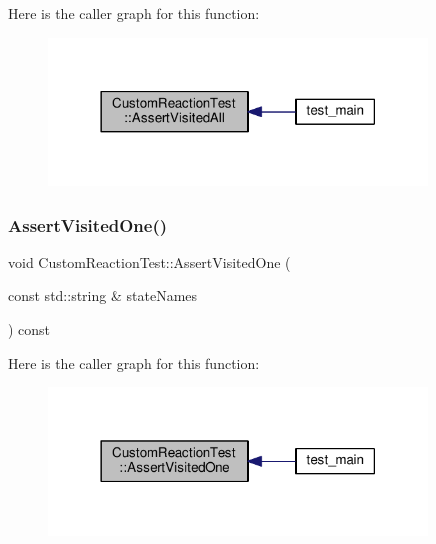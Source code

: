 Here is the caller graph for this function\+:
\nopagebreak
\begin{figure}[H]
\begin{center}
\leavevmode
\includegraphics[width=285pt]{struct_custom_reaction_test_a0f75c5c035c97fa960064afa6656ae06_icgraph}
\end{center}
\end{figure}
\mbox{\label{struct_custom_reaction_test_aab84126951398a6b976417dc01ceacb0}} 
\subsubsection{\texorpdfstring{Assert\+Visited\+One()}{AssertVisitedOne()}}
{\footnotesize\ttfamily void Custom\+Reaction\+Test\+::\+Assert\+Visited\+One (\begin{DoxyParamCaption}\item[{const std\+::string \&}]{state\+Names }\end{DoxyParamCaption}) const\hspace{0.3cm}{\ttfamily [inline]}}

Here is the caller graph for this function\+:
\nopagebreak
\begin{figure}[H]
\begin{center}
\leavevmode
\includegraphics[width=285pt]{struct_custom_reaction_test_aab84126951398a6b976417dc01ceacb0_icgraph}
\end{center}
\end{figure}
\mbox{\label{struct_custom_reaction_test_a709bb7b5b76023d92a3438eca445d37b}} 
